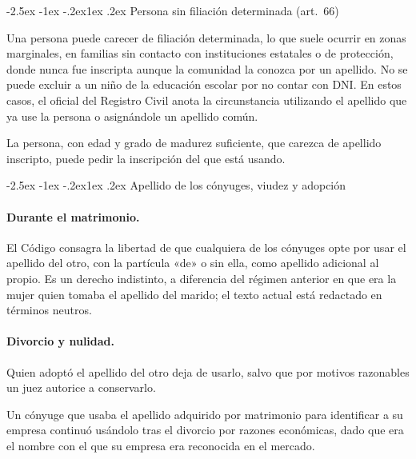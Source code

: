 \documentclass[12pt,oneside]{book}
\makeatletter
\renewcommand\subsection{\@startsection{subsection}{2}{\z@}%
  {-2.5ex \@plus -1ex \@minus -.2ex}{1ex \@plus .2ex}%
  {\normalfont\normalsize\bfseries}}
\makeatother
\begin{document}
\subsection{Persona sin filiación determinada (art.~66)}

Una persona puede carecer de filiación determinada, lo que suele ocurrir en zonas marginales, en familias sin contacto con instituciones estatales o de protección, donde nunca fue inscripta aunque la comunidad la conozca por un apellido. No se puede excluir a un niño de la educación escolar por no contar con DNI. En estos casos, el oficial del Registro Civil anota la circunstancia utilizando el apellido que ya use la persona o asignándole un apellido común.

\begin{regla}
La persona, con edad y grado de madurez suficiente, que carezca de apellido inscripto, puede pedir la inscripción del que está usando.
\end{regla}

\subsection{Apellido de los cónyuges, viudez y adopción}

\paragraph{Durante el matrimonio.} El Código consagra la libertad de que cualquiera de los cónyuges opte por usar el apellido del otro, con la partícula «de» o sin ella, como apellido adicional al propio. Es un derecho indistinto, a diferencia del régimen anterior en que era la mujer quien tomaba el apellido del marido; el texto actual está redactado en términos neutros.

\paragraph{Divorcio y nulidad.} Quien adoptó el apellido del otro deja de usarlo, salvo que por motivos razonables un juez autorice a conservarlo.

\begin{ejemplo}
Un cónyuge que usaba el apellido adquirido por matrimonio para identificar a su empresa continuó usándolo tras el divorcio por razones económicas, dado que era el nombre con el que su empresa era reconocida en el mercado.
\end{ejemplo}
\end{document}
